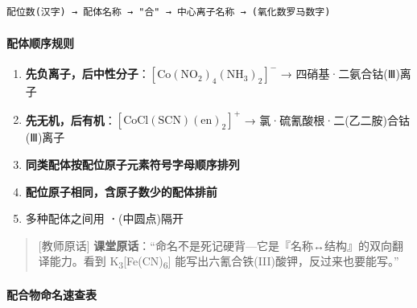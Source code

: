 \begin{verbatim}
配位数(汉字) → 配体名称 → "合" → 中心离子名称 → (氧化数罗马数字)
\end{verbatim}

\paragraph{配体顺序规则}\label{ux914dux4f53ux987aux5e8fux89c4ux5219}

\begin{enumerate}
\def\labelenumi{\arabic{enumi}.}
\tightlist
\item
  \textbf{先负离子，后中性分子}：\([\mathrm{Co(NO_2)_4(NH_3)_2}]^-\) → 四硝基·二氨合钴(Ⅲ)离子
\item
  \textbf{先无机，后有机}：\([\mathrm{CoCl(SCN)(en)_2}]^+\) → 氯·硫氰酸根·二(乙二胺)合钴(Ⅲ)离子
\item
  \textbf{同类配体按配位原子元素符号字母顺序排列}
\item
  \textbf{配位原子相同，含原子数少的配体排前}
\item
  多种配体之间用 \textbf{·}(中圆点)隔开
\end{enumerate}

\begin{quote}
{[}教师原话{]} \textbf{课堂原话}：``命名不是死记硬背---它是『名称↔结构』的双向翻译能力。看到 K\textsubscript{3}{[}Fe(CN)\textsubscript{6}{]} 能写出六氰合铁(III)酸钾，反过来也要能写。''
\end{quote}

\paragraph{配合物命名速查表}\label{ux914dux5408ux7269ux547dux540dux901fux67e5ux8868}

